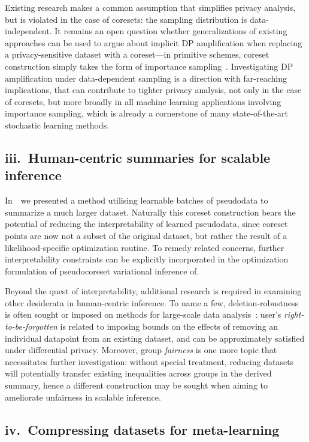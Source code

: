 \documentclass[11pt,a4paper,sans]{moderncv} %
\begin{document}
Existing research makes a common assumption that simplifies privacy analysis, but is violated in the case of coresets: the sampling distribution is data-independent. It remains an open question whether generalizations of existing approaches can be used to argue about implicit DP amplification when replacing a privacy-sensitive dataset with a coreset---in primitive schemes, coreset construction simply takes the form of importance sampling~\citep{bachem17}. Investigating DP amplification under data-dependent sampling is a direction with far-reaching implications, that can contribute to tighter privacy analysis, not only in the case of coresets, but more broadly in all machine learning applications involving importance sampling, which is already a cornerstone of many state-of-the-art stochastic learning methods. 


\subsection{iii.~Human-centric summaries for scalable inference}
\label{subsec:human-centric-pseudodata}

In~\citep{psvi}~we presented a method utilising learnable batches of pseudodata to summarize a much larger dataset. Naturally this coreset construction bears the potential of reducing the interpretability of learned pseudodata, since coreset points are now not a subset of the original dataset, but rather the result of a likelihood-specific optimization routine. To remedy related concerns, further interpretability constraints can be explicitly incorporated in the optimization formulation of pseudocoreset variational inference of.

Beyond the quest of interpretability, additional research is required in examining other desiderata in human-centric inference. To name a few, deletion-robustness is often sought or imposed on methods for large-scale data analysis~\citep{mirzasoleiman17, ginart19}: user's \emph{right-to-be-forgotten} is related to imposing bounds on the effects of removing an individual datapoint from an existing dataset, and can be approximately satisfied under differential privacy. Moreover, group \emph{fairness} is one more topic that necessitates further investigation: without special treatment, reducing datasets will potentially transfer existing inequalities across groups in the derived summary, hence a different construction may be sought when aiming to ameliorate unfairness in scalable inference.  

\subsection{iv.~Compressing datasets for meta-learning}
\label{subsec:metacoresets}
\end{document}
